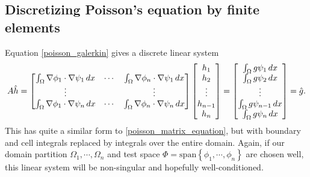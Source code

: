 % 
% 

\subsection{Discretizing Poisson's equation by finite elements}

Equation \eqref{poisson_galerkin} gives a discrete linear system
\renewcommand{\integralentry}[2]{\int_{\Omega}\nabla\phi_{#2} \cdot \nabla\psi_{#1}\,dx}
\begin{equation}\label{poisson_fem_matrix_equation}
    A\hat{h} = \begin{bmatrix}
            \integralentry{1}{1} & \cdots & \integralentry{1}{n} \\
            \vdots & & \vdots \\
            \integralentry{n}{1} & \cdots & \integralentry{n}{n}
            \end{bmatrix}
    \begin{bmatrix} h_1 \\ h_2 \\ \vdots \\ h_{n-1} \\ h_n \end{bmatrix}
    =
    \begin{bmatrix} \int_{\om}g\psi_1\,dx \\ \int_{\om}g\psi_2\,dx \\ \vdots \\ \int_{\om}g\psi_{n-1}\,dx \\ \int_{\om}g\psi_{n}\,dx \end{bmatrix}
    = \hat{g}.
\end{equation}
This has quite a similar form to \eqref{poisson_matrix_equation}, but with boundary and cell integrals replaced by integrals over the entire
domain.
Again, if our domain partition $\Omega_1,\cdots,\Omega_n$ and test space $\Phi = \text{span}\left\{\phi_1,\cdots,\phi_n\right\}$
are chosen well, this linear system will be non-singular and hopefully well-conditioned.

